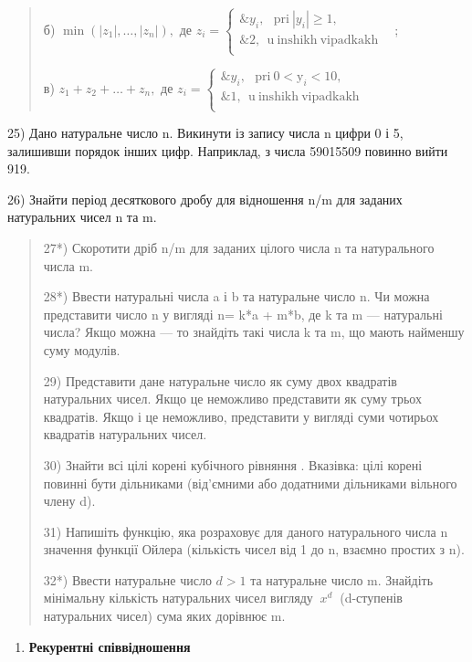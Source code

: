 \documentclass[]{article}
\begin{document}
\begin{quote}
б) \(\min(\left| z_{1} \right|,\ldots,\left| z_{n} \right|),\) де
\(z_{i} = \left\{ \begin{matrix}
\& y_{i},\mathrm{\ \ \ pri\ }\left| y_{i} \right| \geq 1, \\
\& 2,\mathrm{\ \ u\ inshikh\ vipadkakh\ \ \ } \\
\end{matrix} \right.\ \);

в) \(z_{1} + z_{2} + \ldots + z_{n},\) де
\(z_{i} = \left\{ \begin{matrix}
\& y_{i},\mathrm{\ \ \ pri\ 0 <}\mathrm{y}_{i} < 10, \\
\& 1,\mathrm{\ \ u\ inshikh\ vipadkakh\ \ \ } \\
\end{matrix} \right.\ \)
\end{quote}

25) Дано натуральне число n. Викинути із запису числа n цифри 0 і 5,
залишивши порядок інших цифр. Наприклад, з числа 59015509 повинно вийти
919.

26) Знайти період десяткового дробу для відношення n/m для заданих
натуральних чисел n та m.

\begin{quote}
27*) Скоротити дріб n/m для заданих цілого числа n та натурального числа
m.

28*) Ввести натуральні числа a і b та натуральне число n. Чи можна
представити число n у вигляді n= k*a + m*b, де k та m --- натуральні
числа? Якщо можна --- то знайдіть такі числа k та m, що мають найменшу
суму модулів.

29) Представити дане натуральне число як суму двох квадратів натуральних
чисел. Якщо це неможливо представити як суму трьох квадратів. Якщо і це
неможливо, представити у вигляді суми чотирьох квадратів натуральних
чисел.

30) Знайти всі цілі корені кубічного рівняння . Вказівка: цілі корені
повинні бути дільниками (від'ємними або додатними дільниками вільного
члену d).

31) Напишіть функцію, яка розраховує для даного натурального числа n
значення функції Ойлера (кількість чисел від 1 до n, взаємно простих з
n).

32*) Ввести натуральне число \(d > 1\) та натуральне число m. Знайдіть
мінімальну кількість натуральних чисел вигляду \(\ x^{d}\ \) (d-ступенів
натуральних чисел) сума яких дорівнює m.
\end{quote}

\begin{enumerate}
\def\labelenumi{\arabic{enumi}.}
\item
  \textbf{Рекурентні співвідношення}
\end{enumerate}
\end{document}
